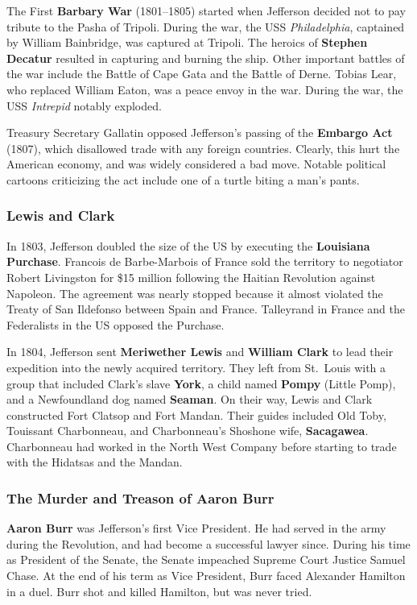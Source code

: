 The First \textbf{Barbary War} (1801--1805)
started when Jefferson decided not to pay tribute to the Pasha of Tripoli.
During the war, the USS \textit{Philadelphia}, captained by William Bainbridge,
was captured at Tripoli.
The heroics of \textbf{Stephen Decatur} resulted in capturing and burning the ship.
Other important battles of the war include the Battle of Cape Gata and the Battle of Derne.
Tobias Lear, who replaced William Eaton, was a peace envoy in the war.
During the war, the USS \textit{Intrepid} notably exploded.

Treasury Secretary Gallatin opposed Jefferson's passing of the \textbf{Embargo Act} (1807),
which disallowed trade with any foreign countries.
Clearly, this hurt the American economy, and was widely considered a bad move.
Notable political cartoons criticizing the act include one of a turtle biting a man's pants.

\subsubsection*{Lewis and Clark}

In 1803, Jefferson doubled the size of the US by executing the \textbf{Louisiana Purchase}.
Francois de Barbe-Marbois of France sold the territory
to negotiator Robert Livingston for \$15 million
following the Haitian Revolution against Napoleon.
The agreement was nearly stopped
because it almost violated the Treaty of San Ildefonso between Spain and France.
Talleyrand in France and the Federalists in the US opposed the Purchase.

In 1804, Jefferson sent \textbf{Meriwether Lewis} and \textbf{William Clark}
to lead their expedition into the newly acquired territory.
They left from St.\ Louis with a group that included
Clark's slave \textbf{York}, a child named \textbf{Pompy} (Little Pomp),
and a Newfoundland dog named \textbf{Seaman}.
On their way, Lewis and Clark constructed Fort Clatsop and Fort Mandan.
Their guides included Old Toby, Touissant Charbonneau, and Charbonneau's Shoshone wife,
\textbf{Sacagawea}.
Charbonneau had worked in the North West Company
before starting to trade with the Hidatsas and the Mandan.

\subsubsection*{The Murder and Treason of Aaron Burr}

\textbf{Aaron Burr} was Jefferson's first Vice President.
He had served in the army during the Revolution, and had become a successful lawyer since.
During his time as President of the Senate, the Senate impeached Supreme Court Justice Samuel Chase.
At the end of his term as Vice President, Burr faced Alexander Hamilton in a duel.
Burr shot and killed Hamilton, but was never tried.

